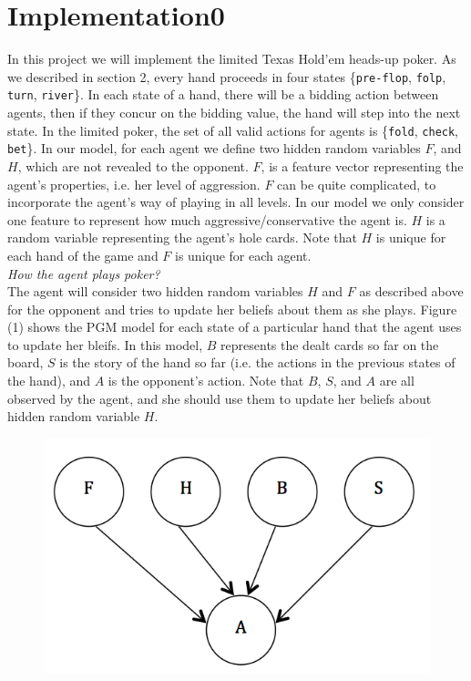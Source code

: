 \section{Implementation0}
In this project we will implement the limited Texas Hold'em heads-up poker. As we
described in section 2, every hand proceeds in four states \{{\tt pre-flop}, {\tt folp}, 
{\tt turn}, {\tt river}\}. In each state of a hand, there will be a bidding action 
between agents, then if they concur on the bidding value, the hand will
step into the next state. In the limited poker, the set of all valid actions 
for agents is \{{\tt fold}, {\tt check}, {\tt bet}\}. In our model, for each agent
we define two hidden random variables $F$, and $H$, which are not revealed to the
opponent. $F$, is a feature vector representing the agent's properties, i.e. her 
level of aggression. $F$ can be quite complicated, to incorporate the 
agent's way of playing in all levels. In our model we only consider one feature 
to represent how much aggressive/conservative the agent is. $H$ is a random
variable representing the agent's hole cards. Note that $H$ is unique for 
each hand of the game and $F$ is unique for each agent.
\\
\emph{How the agent plays poker?}\\
The agent will consider two hidden random variables $H$ and $F$ as described above 
for the opponent and tries to update her beliefs about them as she plays. Figure (1) shows the
PGM model for each state of a particular hand that the agent uses to update her 
bleifs. In this model, $B$ represents the dealt cards so far on the board, $S$ is the 
story of the hand so far (i.e. the actions in the previous states of the hand), and 
$A$ is the opponent's action. Note that $B$, $S$, and $A$ are all observed by the
agent, and she should use them to update her beliefs about hidden random variable
$H$.
 
\begin{figure}[h!]
  	\centering
 	\includegraphics[scale = .55]{fig1}
\end{figure}

